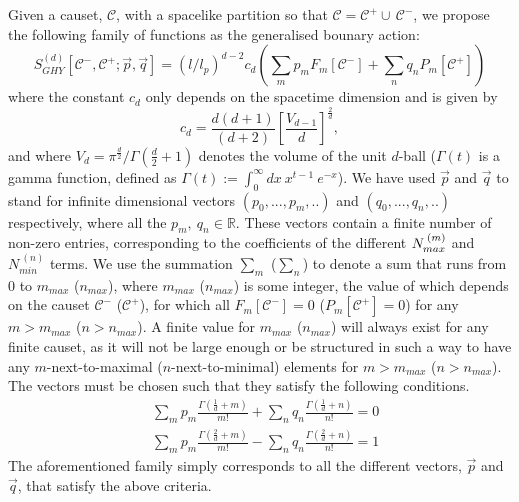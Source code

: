 \documentclass[12pt]{article}
\newcommand{\be}{\begin{equation}}
\newcommand{\ee}{\end{equation}}
\newcommand{\F}[1]{F_{#1}}
\renewcommand{\P}[1]{P_{#1}}
\begin{document}
Given a causet, $\mathcal{C}$, with a spacelike partition so that $\mathcal C = \mathcal C^+ \cup\, \mathcal C^-$, we propose the following family of functions as the generalised bounary action:
\be\label{general_boundary_sum}
S^{ (d)}_{GHY}\left[\mathcal{C}^-,\mathcal{C}^+;\vec{p}, \vec{q} \right]= \left (l/l_p\right)^{d-2} c_{d}
\left ( \sum_m p_m \F{m}\left[\mathcal{C}^- \right]
+  \sum_n q_n \P{m}\left[\mathcal{C}^+ \right]\right)
\ee
where the constant $c_{d}$ only depends on the spacetime dimension and is given by
\be\label{Cn}
c_{d}=\frac{d (d+1)}{ (d+2)}\left[\frac{V_{d-1}}{d}\right]^{\frac{2}{d}},
\ee
and where $V_d=\pi^{\frac{d}{2}}/\Gamma\left (\frac{d}{2}+1\right)$ denotes the volume of the unit $d$-ball ($\Gamma (t)$ is a gamma function, defined as $\Gamma (t):=\int_0^\infty dx\: x^{t-1}\: e^{-x}$). We have used $\vec{p}$ and $\vec{q}$ to stand for infinite dimensional vectors $ (p_0,...,p_m,..)$ and $ (q_0,...,q_n,..)$ respectively, where all the $p_m,\: q_n \in \mathbb{R}$. These vectors contain a finite number of non-zero entries, corresponding to the coefficients of the different $N_{{max\vphantom{i}}}^{\: (m)}$ and $N_{{min}}^{\: (n)}$ terms. We use the summation $\sum_m$ ($\sum_n$) to denote a sum that runs from $0$ to $m_{max}$ ($n_{max}$), where $m_{max}$ ($n_{max}$) is some integer, the value of which depends on the causet $\mathcal{C}^-$ ($\mathcal{C}^+$), for which all $\F{m}\left[\mathcal{C}^- \right]=0$ ($\P{m}\left[\mathcal{C}^+ \right]=0$) for any $m>m_{max}$ ($n>n_{max}$). A finite value for $m_{max}$ ($n_{max}$) will always exist for any finite causet, as it will not be large enough or be structured in such a way to have any $m$-next-to-maximal ($n$-next-to-minimal) elements for $m>m_{max}$ ($n>n_{max}$). The vectors must be chosen such that they satisfy the following conditions.
\begin{align}\label{coefficient_relation1}
& \sum_m p_m \frac{\Gamma\left (\frac{1}{d}+m \right)}{m!}  + \sum_n q_n\frac{\Gamma\left (\frac{1}{d}+n \right)}{n!}=0
\\
& \label{coefficient_relation2}\sum_m p_m \frac{\Gamma\left (\frac{2}{d}+m \right)}{m!}  - \sum_n q_n\frac{\Gamma\left (\frac{2}{d}+n \right)}{n!}=1
\end{align}
The aforementioned family simply corresponds to all the different vectors, $\vec{p}$ and $\vec{q}$, that satisfy the above criteria.
\end{document}
